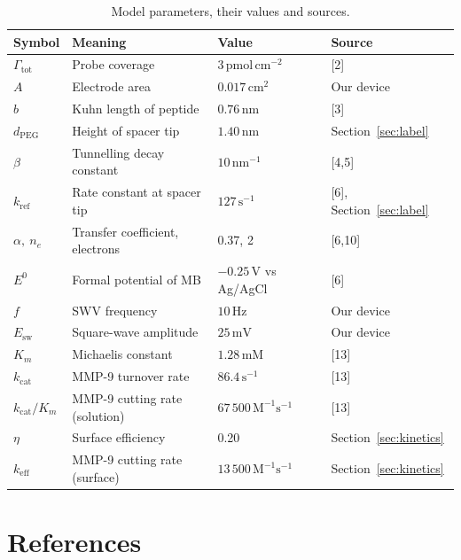 \documentclass[10pt,a4paper]{article}
\numberwithin{equation}{section}
\newcommand{\cit}[1]{[#1]}
\newcommand{\dpeg}{d_{\mathrm{PEG}}}
\newcommand{\Gtot}{\Gamma_{\mathrm{tot}}}
\newcommand{\kref}{k_{\mathrm{ref}}}
\newcommand{\keff}{k_{\mathrm{eff}}}
\newcommand{\kcat}{k_{\mathrm{cat}}}
\newcommand{\Km}{K_m}
\begin{document}
\begin{table}[H]
\centering
\footnotesize\renewcommand{\arraystretch}{1.25}
\begin{tabular}{@{}llll@{}}
\toprule
Symbol & Meaning & Value & Source \\
\midrule
$\Gtot$ & Probe coverage & $3\,\mathrm{pmol\,cm^{-2}}$ & \cit{2} \\
$A$ & Electrode area & $0.017\,\mathrm{cm^2}$ & Our device \\
$b$ & Kuhn length of peptide & $0.76\,\mathrm{nm}$ & \cit{3} \\
$\dpeg$ & Height of spacer tip & $1.40\,\mathrm{nm}$ & Section~\ref{sec:label} \\
$\beta$ & Tunnelling decay constant & $10\,\mathrm{nm^{-1}}$ & \cit{4,5} \\
$\kref$ & Rate constant at spacer tip & $127\,\mathrm{s^{-1}}$ & \cit{6}, Section~\ref{sec:label} \\
$\alpha,\ n_e$ & Transfer coefficient, electrons & 0.37, 2 & \cit{6,10} \\
$E^0$ & Formal potential of MB & $-0.25\,\mathrm{V}$ vs Ag/AgCl & \cit{6} \\
$f$ & SWV frequency & $10\,\mathrm{Hz}$ & Our device \\
$E_{\mathrm{sw}}$ & Square-wave amplitude & $25\,\mathrm{mV}$ & Our device \\
$\Km$ & Michaelis constant & $1.28\,\mathrm{mM}$ & \cit{13} \\
$\kcat$ & MMP-9 turnover rate & $86.4\,\mathrm{s^{-1}}$ & \cit{13} \\
$\kcat/\Km$ & MMP-9 cutting rate (solution) & $67\,500\,\mathrm{M^{-1}s^{-1}}$ & \cit{13} \\
$\eta$ & Surface efficiency & 0.20 & Section~\ref{sec:kinetics} \\
$\keff$ & MMP-9 cutting rate (surface) & $13\,500\,\mathrm{M^{-1}s^{-1}}$ & Section~\ref{sec:kinetics} \\
\bottomrule
\end{tabular}
\caption{Model parameters, their values and sources.}
\label{tab:parameters}
\end{table}

\section*{References}
\end{document}

